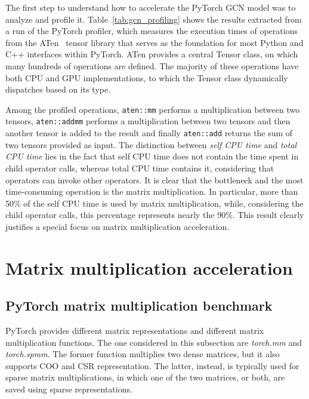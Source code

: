 The first step to understand how to accelerate the PyTorch GCN model was to analyze and profile it.
Table~\ref{tab:gcn_profiling} shows the results extracted from a run of the PyTorch profiler, which measures the execution times of operations from the ATen~\cite{aten} tensor library that serves as the foundation for most Python and C++ interfaces within PyTorch.
ATen provides a central Tensor class, on which many hundreds of operations are defined.
The majority of these operations have both CPU and GPU implementations, to which the Tensor class dynamically dispatches based on its type.

Among the profiled operations, \lstinline{aten::mm} performs a multiplication between two tensors, \lstinline{aten::addmm} performs a multiplication between two tensors and then another tensor is added to the result and finally \lstinline{aten::add} returns the sum of two tensors provided as input.
The distinction between \textit{self CPU time} and \textit{total CPU time} lies in the fact that self CPU time does not contain the time spent in child operator calls, whereas total CPU time contains it, considering that operators can invoke other operators.
It is clear that the bottleneck and the most time-consuming operation is the matrix multiplication.
In particular, more than 50\% of the self CPU time is used by matrix multiplication, while, considering the child operator calls, this percentage represents nearly the 90\%.
This result clearly justifies a special focus on matrix multiplication acceleration.

\section{Matrix multiplication acceleration}
\label{sec:matmul-acceleration}%

\subsection{PyTorch matrix multiplication benchmark}
\label{subsec:pytorch-matmul-bench}%

PyTorch provides different matrix representations and different matrix multiplication functions.
The one considered in this subsection are \textit{torch.mm} and \textit{torch.spmm}.
The former function multiplies two dense matrices, but it also supports COO and CSR representation.
The latter, instead, is typically used for sparse matrix multiplications, in which one of the two matrices, or both, are saved using sparse representations.


